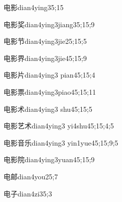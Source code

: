 \begin{verbete}{电影}{dian4ying3}{5;15}
\end{verbete}

\begin{verbete}{电影奖}{dian4ying3jiang3}{5;15;9}
\end{verbete}

\begin{verbete}{电影节}{dian4ying3jie2}{5;15;5}
\end{verbete}

\begin{verbete}{电影界}{dian4ying3jie4}{5;15;9}
\end{verbete}

\begin{verbete}{电影片}{dian4ying3 pian4}{5;15;4}
\end{verbete}

\begin{verbete}{电影票}{dian4ying3piao4}{5;15;11}
\end{verbete}

\begin{verbete}{电影术}{dian4ying3 shu4}{5;15;5}
\end{verbete}

\begin{verbete}{电影艺术}{dian4ying3 yi4shu4}{5;15;4;5}
\end{verbete}

\begin{verbete}{电影音乐}{dian4ying3 yin1yue4}{5;15;9;5}
\end{verbete}

\begin{verbete}{电影院}{dian4ying3yuan4}{5;15;9}
\end{verbete}

\begin{verbete}{电邮}{dian4you2}{5;7}
\end{verbete}

\begin{verbete}{电子}{dian4zi3}{5;3}
\end{verbete}

